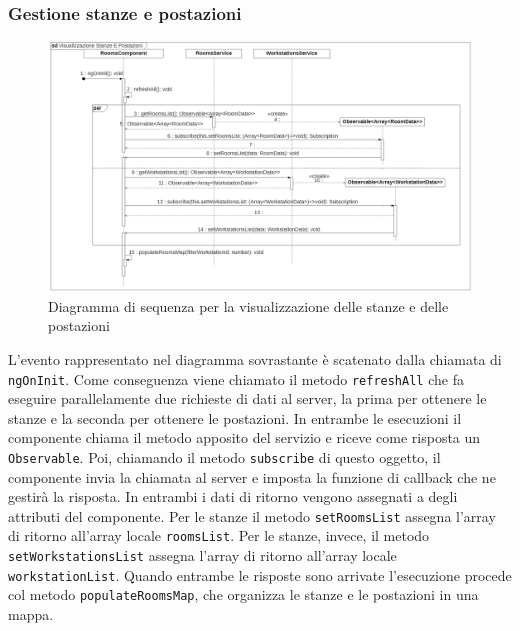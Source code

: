 \subsubsection{Gestione stanze e postazioni}
\begin{figure}[H]
	\centering
	\includegraphics[width=18cm]{res/images/webapp-visualStanzePostazioni-diagrammaSequenza.png}
	\caption{Diagramma di sequenza per la visualizzazione delle stanze e delle postazioni}
	\label{fig:DiagrammaSequenzaStanzePostazioni1}
\end{figure}
L'evento rappresentato nel diagramma sovrastante è scatenato dalla chiamata di \texttt{ngOnInit}. Come conseguenza viene chiamato il metodo \texttt{refreshAll} che fa eseguire parallelamente due richieste di dati al server, la prima per ottenere le stanze e la seconda per ottenere le postazioni. In entrambe le esecuzioni il componente chiama il metodo apposito del servizio e riceve come risposta un \texttt{Observable}. Poi, chiamando il metodo \texttt{subscribe} di questo oggetto, il componente invia la chiamata al server e imposta la funzione di callback che ne gestirà la risposta. In entrambi i dati di ritorno vengono assegnati a degli attributi del componente. Per le stanze il metodo \texttt{setRoomsList} assegna l'array di ritorno all'array locale \texttt{roomsList}. Per le stanze, invece, il metodo \texttt{setWorkstationsList} assegna l'array di ritorno all'array locale \texttt{workstationList}. Quando entrambe le risposte sono arrivate l'esecuzione procede col metodo \texttt{populateRoomsMap}, che organizza le stanze e le postazioni in una mappa. 
